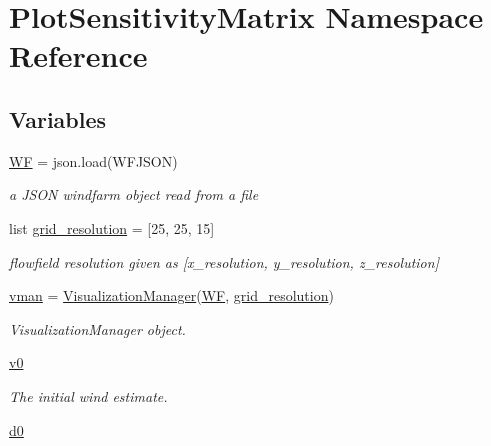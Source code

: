 \hypertarget{namespace_plot_sensitivity_matrix}{}\section{Plot\+Sensitivity\+Matrix Namespace Reference}
\label{namespace_plot_sensitivity_matrix}
\subsection*{Variables}
\begin{DoxyCompactItemize}
\item 
\mbox{\hyperlink{namespace_plot_sensitivity_matrix_ab3a981e10a7fb62fd0803b775cfc9c6e}{WF}} = json.\+load(W\+F\+J\+S\+ON)
\begin{DoxyCompactList}\small\item\em a J\+S\+ON windfarm object read from a file \end{DoxyCompactList}\item 
list \mbox{\hyperlink{namespace_plot_sensitivity_matrix_acceedf9e01ea99cebd60321cfe5f1563}{grid\+\_\+resolution}} = \mbox{[}25, 25, 15\mbox{]}
\begin{DoxyCompactList}\small\item\em flowfield resolution given as \mbox{[}x\+\_\+resolution, y\+\_\+resolution, z\+\_\+resolution\mbox{]} \end{DoxyCompactList}\item 
\mbox{\hyperlink{namespace_plot_sensitivity_matrix_a561c3184abc48dd7ca3ac05112482a82}{vman}} = \mbox{\hyperlink{classvisualization__manager___d_j_1_1_visualization_manager}{Visualization\+Manager}}(\mbox{\hyperlink{namespace_plot_sensitivity_matrix_ab3a981e10a7fb62fd0803b775cfc9c6e}{WF}}, \mbox{\hyperlink{namespace_plot_sensitivity_matrix_acceedf9e01ea99cebd60321cfe5f1563}{grid\+\_\+resolution}})
\begin{DoxyCompactList}\small\item\em Visualization\+Manager object. \end{DoxyCompactList}\item 
\mbox{\hyperlink{namespace_plot_sensitivity_matrix_a9c4c4d6959315c8f430d5e0b4b59945d}{v0}}
\begin{DoxyCompactList}\small\item\em The initial wind estimate. \end{DoxyCompactList}\item 
\mbox{\hyperlink{namespace_plot_sensitivity_matrix_ab6a17ada413ce5e414bbd5c3d6148868}{d0}}

\end{DoxyCompactItemize}
